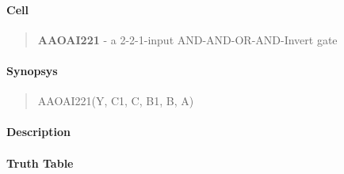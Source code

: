 \label{AAOAI221}
\paragraph{Cell}
\begin{quote}
    \textbf{AAOAI221} - a 2-2-1-input AND-AND-OR-AND-Invert gate
\end{quote}

\paragraph{Synopsys}
\begin{quote}
    AAOAI221(Y, C1, C, B1, B, A)
\end{quote}

\paragraph{Description}

%

\paragraph{Truth Table}
%

